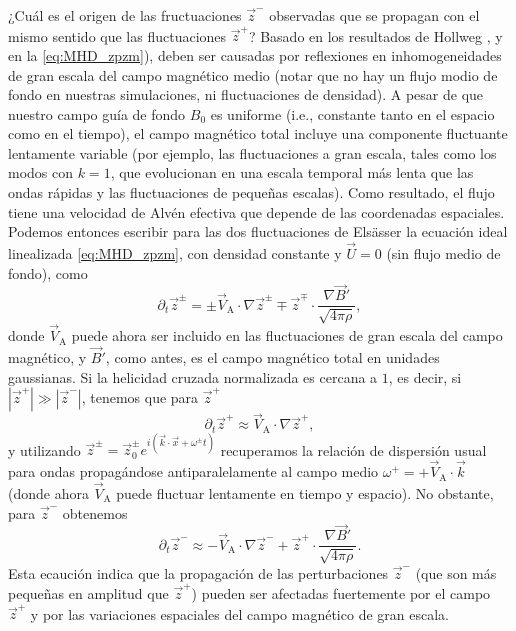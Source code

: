 ¿Cuál es el origen de las fructuaciones $\vec{z}^-$ observadas que se
propagan con el mismo sentido que las fluctuaciones $\vec{z}^+$?
Basado en los resultados de Hollweg \cite{hollweg_1990_wkb}, y en la
\cref{eq:MHD_zpzm}), deben ser causadas por reflexiones en
inhomogeneidades de gran escala del campo magnético medio (notar que
no hay un flujo modio de fondo en nuestras simulaciones, ni
fluctuaciones de densidad).  A pesar de que nuestro campo guía de
fondo $B_0$ es uniforme (i.e., constante tanto en el espacio como en
el tiempo), el campo magnético total incluye una componente fluctuante
lentamente variable (por ejemplo, las fluctuaciones a gran escala,
tales como los modos con $k=1$, que evolucionan en una escala temporal
más lenta que las ondas rápidas y las fluctuaciones de pequeñas
escalas).  Como resultado, el flujo tiene una velocidad de Alvén
efectiva que depende de las coordenadas espaciales. Podemos entonces
escribir para las dos fluctuaciones de Els\"asser la ecuación ideal
linealizada \ref{eq:MHD_zpzm}, con densidad constante y $\vec{U}=0$
(sin flujo medio de fondo), como
\begin{equation}
\partial_t \vec{z}^\pm = \pm \vec{V}_\textrm{A} \cdot \nabla \vec{z}^\pm 
    \mp \vec{z}^\mp \cdot \frac{\nabla \vec{B}'}{\sqrt{4\pi \rho}} ,
\end{equation}
donde $\vec{V}_\textrm{A}$ puede ahora ser incluido en las
fluctuaciones de gran escala del campo magnético, y $\vec{B}'$, como
antes, es el campo magnético total en unidades gaussianas. Si la
helicidad cruzada normalizada es cercana a $1$, es decir, si
$|\vec{z}^+| \gg |\vec{z}^-|$, tenemos que para $\vec{z}^+$
\begin{equation}
\partial_t \vec{z}^+  \approx \vec{V}_\textrm{A} \cdot \nabla \vec{z}^+ ,
\end{equation}
y utilizando $\vec{z}^\pm = \vec{z}_0^\pm e^{i(\vec{k}\cdot
  \vec{x}+\omega^\pm t)}$ recuperamos la relación de dispersión usual
para ondas propagándose antiparalelamente al campo medio $\omega^+ =
+\vec{V}_\textrm{A} \cdot \vec{k}$ (donde ahora $\vec{V}_\textrm{A}$
puede fluctuar lentamente en tiempo y espacio). No obstante, para
$\vec{z}^-$ obtenemos
\begin{equation}
\partial_t \vec{z}^- \approx - \vec{V}_\textrm{A} \cdot \nabla \vec{z}^- + \vec{z}^+ 
    \cdot \frac{\nabla \vec{B}'}{\sqrt{4\pi \rho}} .
\label{eq:zmlinear}
\end{equation}
Esta ecaución indica que la propagación de las perturbaciones
$\vec{z}^-$ (que son más pequeñas en amplitud que $\vec{z}^+$) pueden
ser afectadas fuertemente por el campo $\vec{z}^+$ y por las
variaciones espaciales del campo magnético de gran escala.

